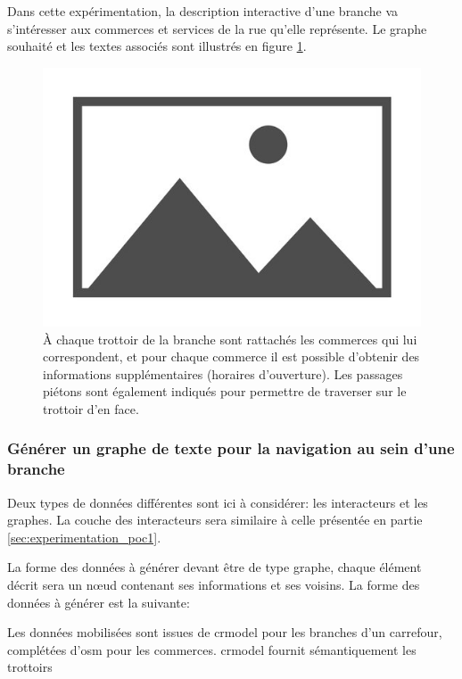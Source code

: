 \newpar{}

Dans cette expérimentation, la description interactive d'une branche va s'intéresser aux commerces et services de la rue qu'elle représente. Le graphe souhaité et les textes associés sont illustrés en figure \ref{fig:experimentation_deri2_exemple}.

\begin{figure}[ht]
    \centering
    \includegraphics{images/placeholder.jpg}
    \caption{À chaque trottoir de la branche sont rattachés les commerces qui lui correspondent, et pour chaque commerce il est possible d'obtenir des informations supplémentaires (horaires d'ouverture). Les passages piétons sont également indiqués pour permettre de traverser sur le trottoir d'en face.}
    \label{fig:experimentation_deri2_exemple}
\end{figure}

\subsubsection{Générer un graphe de texte pour la navigation au sein d'une branche}

Deux types de données différentes sont ici à considérer: les interacteurs et les graphes. La couche des interacteurs sera similaire à celle présentée en partie \ref{sec:experimentation_poc1}. 

La forme des données à générer devant être de type graphe, chaque élément décrit sera un nœud contenant ses informations et ses voisins. La forme des données à générer est la suivante:



Les données mobilisées sont issues de crmodel pour les branches d'un carrefour, complétées d'\gls{osm} pour les commerces. crmodel fournit sémantiquement les trottoirs

